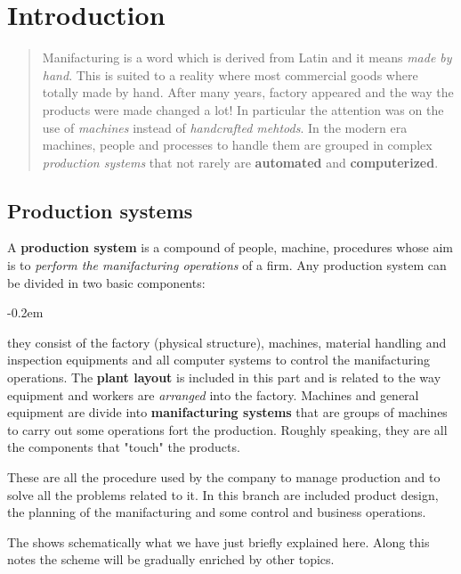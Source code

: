\chapter{Introduction}

\begin{quotation}
    \noindent
    \textsf{
        Manifacturing is a word which is derived from Latin and it means \textit{made by hand}. This is suited to a reality where most commercial goods where totally made by hand. After many years, factory appeared and the way the products were made changed a lot! In particular the attention was on the use of \textit{machines} instead of \textit{handcrafted mehtods}. In the modern era machines, people and processes to handle them are grouped in complex \textit{production systems} that not rarely are \textbf{automated} and \textbf{computerized}.  
    }
\end{quotation}

\section{Production systems}
A \textbf{production system} is a compound of people, machine, procedures whose aim is to \textit{perform the manifacturing operations} of a firm. Any production system can be divided in two basic components: 
\begin{description}
    \itemsep-0.2em
    \item[\textsc{Facilities}] they consist of the factory (physical structure), machines, material handling and inspection equipments and all computer systems to control the manifacturing operations. The \textbf{plant layout} is included in this part and is related to the way equipment and workers are \textit{arranged} into the factory. Machines and general equipment are divide into \textbf{manifacturing systems} that are groups of machines to carry out some operations fort the production. Roughly speaking, they are all the components that "touch" the products.
    \item[\textsc{Manifacturing support systems}]  These are all the procedure used by the company to manage production and to solve all the problems related to it. In this branch are included product design, the planning of the manifacturing and some control and business operations.
\end{description}
\noindent
The   shows schematically what we have just briefly explained here. Along this notes the scheme will be gradually enriched by other topics. 

